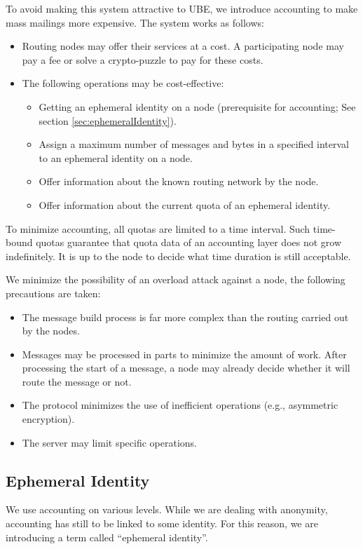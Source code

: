 To avoid making this system attractive to UBE, we introduce accounting to make mass mailings more expensive. The system works as follows:

\begin{itemize}
	\item Routing nodes may offer their services at a cost. A participating node may pay a fee or solve a crypto-puzzle to pay for these costs.
	\item The following operations may be cost-effective:
	\begin{itemize}
		\item Getting an ephemeral identity on a node (prerequisite for accounting; See section \ref{sec:ephemeralIdentity}).
		\item Assign a maximum number of messages and bytes in a specified interval to an ephemeral identity on a node.
		\item Offer information about the known routing network by the node.
		\item Offer information about the current quota of an ephemeral identity.
	\end{itemize}
\end{itemize}
To minimize accounting, all quotas are limited to a time interval. Such time-bound quotas guarantee that quota data of an accounting layer does not grow indefinitely. It is up to the node to decide what time duration is still acceptable.

We minimize the possibility of an overload attack against a node, the following precautions are taken:
\begin{itemize}
	\item The message build process is far more complex than the routing carried out by the nodes.
	\item Messages may be processed in parts to minimize the amount of work. After processing the start of a message, a node may already decide whether it will route the message or not.
	\item The protocol minimizes the use of inefficient operations (e.g., asymmetric encryption).
	\item The server may limit specific operations.
\end{itemize}

\subsection{Ephemeral Identity\label{sec:ephemeralIdentity}}
We use accounting on various levels. While we are dealing with anonymity, accounting has still to be linked to some identity. For this reason, we are introducing a term called ``ephemeral identity''.

